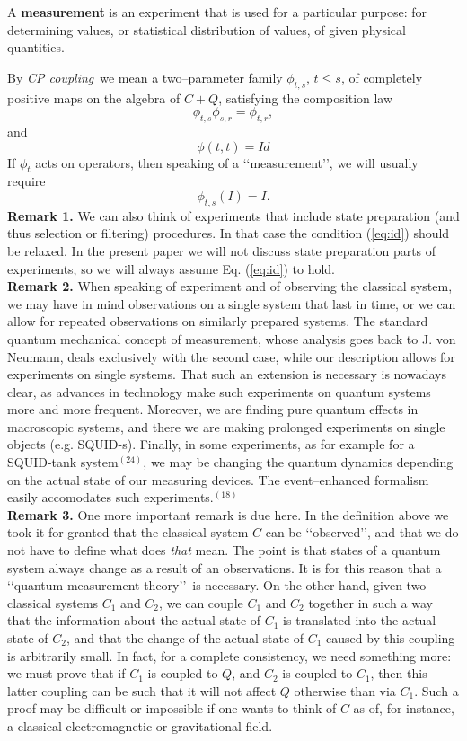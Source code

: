 \documentclass[12pt]{article}
\def\be{\begin{equation}}
\def\ee{\end{equation}}
\def\lqq{\lq\lq}
\def\rqq{\rq\rq}
\begin{document}
\begin{definition}
A {\bf measurement} is an experiment that is used for a particular
purpose: for determining values, or statistical distribution of values,
of given physical quantities.
\end{definition}

By {\sl CP coupling}\, we mean a two--parameter family $\phi_{t,s}$,
$t\leq s$, of completely positive maps on the algebra of $C+Q$,
satisfying the composition law
\be
\phi_{t,s}\phi_{s,r}=\phi_{t,r} ,
\label{eq:comp}
\ee
and
\be
\phi(t,t)=Id
\label{eq:tt}
\ee
If $\phi_t$ acts on operators, then speaking of a \lqq measurement\rqq, we
will usually require
\be
\phi_{t,s}(I)=I.\label{eq:id}
\ee
\noindent
{\bf Remark 1.} We can also think of experiments that include state
preparation (and thus selection or filtering) procedures. In that
case the condition (\ref{eq:id}) should be relaxed. In the present paper
we will not discuss state preparation parts of experiments, so we
will always assume Eq. (\ref{eq:id}) to hold.\medskip\\
\noindent
{\bf Remark 2.} When speaking of experiment and of observing the
classical system, we may have in mind observations on a single system
that last in time, or we can allow for repeated observations on
similarly prepared systems. The standard quantum mechanical concept of
measurement, whose analysis goes back to J. von Neumann, deals
exclusively with the second case, while our description allows for
experiments on single systems. That such an extension is necessary is
nowadays clear, as advances in technology make such experiments on
quantum systems more and more frequent. Moreover, we are finding pure
quantum effects in macroscopic systems, and there we are making
prolonged experiments on single objects (e.g. SQUID-s). Finally, in some
experiments, as for example for a SQUID-tank system$^{(24)}$, we may be
changing the quantum dynamics depending on the actual state of our
measuring devices. The event--enhanced formalism easily accomodates
such experiments.$^{(18)}$\medskip\\
\noindent
{\bf Remark 3.} One more important remark is due here. In the definition
above we took it for granted that the classical system $C$ can be
\lqq observed\rqq, and that we do not have to define what does {\sl that}
mean.
The point is that states of a quantum system always change as a result
of an observations. It is for this reason that a \lqq quantum measurement
theory\rqq\,  is necessary. On the other hand, given two classical systems
$C_1$ and $C_2$, we can couple $C_1$ and $C_2$ together in such a way
that the information about the actual state of $C_1$ is translated into
the actual state of $C_2$, and that the change of the actual state of
$C_1$ caused by this coupling is arbitrarily small. In fact, for a
complete consistency, we need something more: we must prove that if
$C_1$ is coupled to $Q$, and $C_2$ is coupled to $C_1$, then this latter
coupling can be such that it will not affect $Q$ otherwise than via
$C_1$. Such a proof may be difficult or impossible if one wants to think
of $C$ as of, for instance, a classical electromagnetic or gravitational
field.
\end{document}
